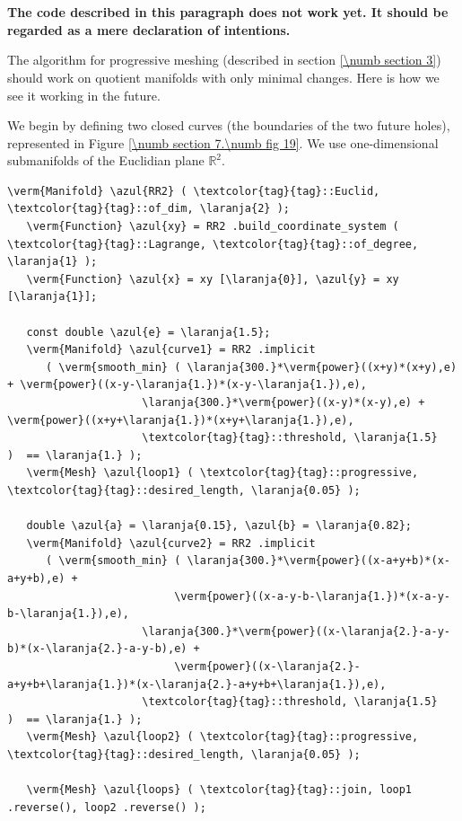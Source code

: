 \section{~~}
\label{\numb section 7.\numb parag 23}

{\normalfont\bfseries The code described in this paragraph does not work yet.
It should be regarded as a mere declaration of intentions.}
\medskip
{}

The algorithm for progressive meshing (described in section \ref{\numb section 3})
should work on quotient manifolds with only minimal changes.
Here is how we see it working in the future.

We begin by defining two closed curves (the boundaries of the two future holes),
represented in Figure \ref{\numb section 7.\numb fig 19}.
We use one-dimensional submanifolds of the Euclidian plane $ \mathbb{R}^2 $.

\begin{Verbatim}[commandchars=\\\{\},formatcom=\small\tt,frame=single,
   rulecolor=\color{moldura},baselinestretch=0.94,framesep=2mm         ]
   \verm{Manifold} \azul{RR2} ( \textcolor{tag}{tag}::Euclid, \textcolor{tag}{tag}::of_dim, \laranja{2} );
   \verm{Function} \azul{xy} = RR2 .build_coordinate_system ( \textcolor{tag}{tag}::Lagrange, \textcolor{tag}{tag}::of_degree, \laranja{1} );
   \verm{Function} \azul{x} = xy [\laranja{0}], \azul{y} = xy [\laranja{1}];

   const double \azul{e} = \laranja{1.5};
   \verm{Manifold} \azul{curve1} = RR2 .implicit 
      ( \verm{smooth_min} ( \laranja{300.}*\verm{power}((x+y)*(x+y),e) + \verm{power}((x-y-\laranja{1.})*(x-y-\laranja{1.}),e),
                     \laranja{300.}*\verm{power}((x-y)*(x-y),e) + \verm{power}((x+y+\laranja{1.})*(x+y+\laranja{1.}),e),
                     \textcolor{tag}{tag}::threshold, \laranja{1.5}                     )  == \laranja{1.} );
   \verm{Mesh} \azul{loop1} ( \textcolor{tag}{tag}::progressive, \textcolor{tag}{tag}::desired_length, \laranja{0.05} );
      
   double \azul{a} = \laranja{0.15}, \azul{b} = \laranja{0.82};
   \verm{Manifold} \azul{curve2} = RR2 .implicit 
      ( \verm{smooth_min} ( \laranja{300.}*\verm{power}((x-a+y+b)*(x-a+y+b),e) +
                          \verm{power}((x-a-y-b-\laranja{1.})*(x-a-y-b-\laranja{1.}),e),
                     \laranja{300.}*\verm{power}((x-\laranja{2.}-a-y-b)*(x-\laranja{2.}-a-y-b),e) +
                          \verm{power}((x-\laranja{2.}-a+y+b+\laranja{1.})*(x-\laranja{2.}-a+y+b+\laranja{1.}),e),
                     \textcolor{tag}{tag}::threshold, \laranja{1.5}                           )  == \laranja{1.} );
   \verm{Mesh} \azul{loop2} ( \textcolor{tag}{tag}::progressive, \textcolor{tag}{tag}::desired_length, \laranja{0.05} );

   \verm{Mesh} \azul{loops} ( \textcolor{tag}{tag}::join, loop1 .reverse(), loop2 .reverse() );                     
\end{Verbatim}

